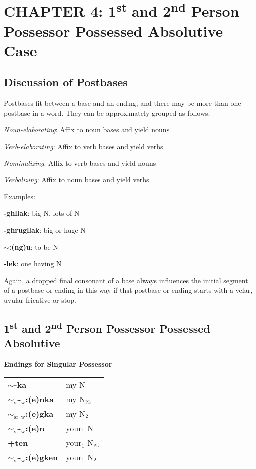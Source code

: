 \documentclass{article}
\begin{document}
\section{CHAPTER 4: 1\textsuperscript{st} and 2\textsuperscript{nd} Person Possessor Possessed Absolutive Case}

\subsection{Discussion of Postbases}

Postbases fit between a base and an ending, and there may be more than one postbase in a word.
%
They can be approximately grouped as follows:

\begin{description}
\item \textit{Noun-elaborating}: Affix to noun bases and yield nouns
\item \textit{Verb-elaborating}: Affix to verb bases and yield verbs
\item \textit{Nominalizing}: Affix to verb bases and yield nouns
\item \textit{Verbalizing}: Affix to noun bases and yield verbs
\end{description}

Examples:

\begin{description}
\item \textbf{-ghllak}: big N, lots of N
\item \textbf{-ghrugllak}: big or huge N
\item \textbf{$\sim$:(ng)u}: to be N
\item \textbf{-lek}: one having N
\end{description}

Again, a dropped final consonant of a base always influences the initial segment of a postbase or ending in this way if that postbase or ending starts with a velar, uvular fricative or stop.

\subsection{1\textsuperscript{st} and 2\textsuperscript{nd} Person Possessor Possessed Absolutive}

\textbf{Endings for Singular Possessor}

\begin{tabular}{ l l }
\textbf{$\sim$-ka} & my N \\ 
\textbf{${\sim}_\text{sf}\text{-}_\text{w}$:(e)nka} & my N$_\text{\textsc{pl}}$ \\  
\textbf{${\sim}_\text{sf}\text{-}_\text{w}$:(e)gka} & my N$_\text{\textsc{2}}$ \\  
\textbf{${\sim}_\text{sf}\text{-}_\text{w}$:(e)n} & your$_1$ N \\  
\textbf{+ten} & your$_1$ N$_\text{\textsc{pl}}$ \\
\textbf{${\sim}_\text{sf}\text{-}_\text{w}$:(e)gken} & your$_1$ N$_\text{\textsc{2}}$ \\  
\end{tabular}
\end{document}
